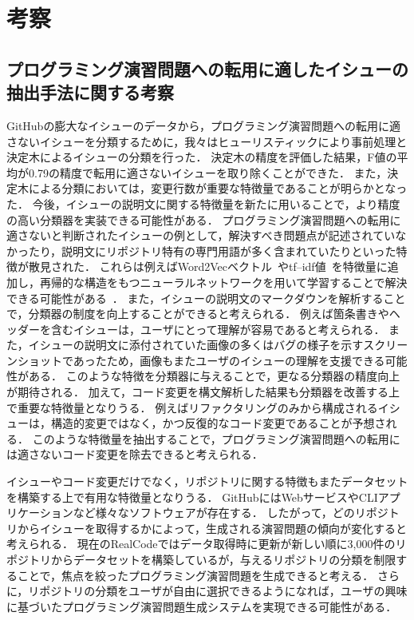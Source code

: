 \chapter{考察}
\graphicspath{{Chapter7/Figs/}}

\section{プログラミング演習問題への転用に適したイシューの抽出手法に関する考察}

GitHubの膨大なイシューのデータから，プログラミング演習問題への転用に適さないイシューを分類するために，我々はヒューリスティックにより事前処理と決定木によるイシューの分類を行った．
決定木の精度を評価した結果，F値の平均が0.79の精度で転用に適さないイシューを取り除くことができた．
また，決定木による分類においては，変更行数が重要な特徴量であることが明らかとなった．
今後，イシューの説明文に関する特徴量を新たに用いることで，より精度の高い分類器を実装できる可能性がある．
プログラミング演習問題への転用に適さないと判断されたイシューの例として，解決すべき問題点が記述されていなかったり，説明文にリポジトリ特有の専門用語が多く含まれていたりといった特徴が散見された．
これらは例えばWord2Vecベクトル~\cite{word2vec}やtf--idf値~\cite{TFIDF}を特徴量に追加し，再帰的な構造をもつニューラルネットワークを用いて学習することで解決できる可能性がある~\cite{RNN_clasification}．
また，イシューの説明文のマークダウンを解析することで，分類器の制度を向上することができると考えられる．
例えば箇条書きやヘッダーを含むイシューは，ユーザにとって理解が容易であると考えられる．
また，イシューの説明文に添付されていた画像の多くはバグの様子を示すスクリーンショットであったため，画像もまたユーザのイシューの理解を支援できる可能性がある．
このような特徴を分類器に与えることで，更なる分類器の精度向上が期待される．
加えて，コード変更を構文解析した結果も分類器を改善する上で重要な特徴量となりうる．
例えばリファクタリングのみから構成されるイシューは，構造的変更ではなく，かつ反復的なコード変更であることが予想される．
このような特徴量を抽出することで，プログラミング演習問題への転用には適さないコード変更を除去できると考えられる．

イシューやコード変更だけでなく，リポジトリに関する特徴もまたデータセットを構築する上で有用な特徴量となりうる．
GitHubにはWebサービスやCLIアプリケーションなど様々なソフトウェアが存在する．
したがって，どのリポジトリからイシューを取得するかによって，生成される演習問題の傾向が変化すると考えられる．
現在のRealCodeではデータ取得時に更新が新しい順に3,000件のリポジトリからデータセットを構築しているが，与えるリポジトリの分類を制限することで，焦点を絞ったプログラミング演習問題を生成できると考える．
さらに，リポジトリの分類をユーザが自由に選択できるようになれば，ユーザの興味に基づいたプログラミング演習問題生成システムを実現できる可能性がある．



